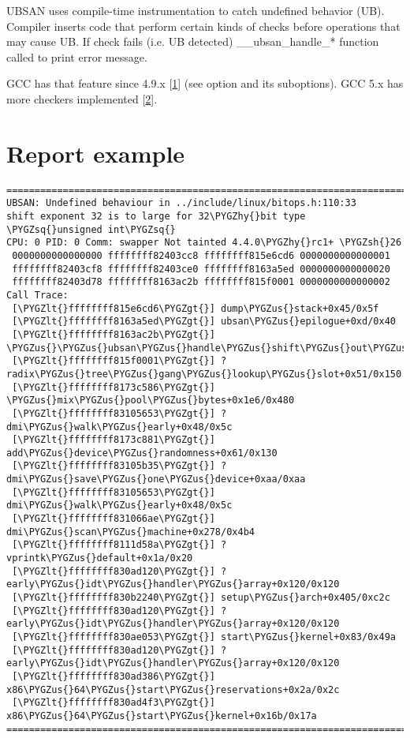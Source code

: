 \documentclass[a4paper,8pt,english]{sphinxmanual}
\def\PYGZus{\char`\_}
\def\PYGZlt{\char`\<}
\def\PYGZgt{\char`\>}
\def\PYGZsh{\char`\#}
\def\PYGZhy{\char`\-}
\def\PYGZsq{\char`\'}
\renewcommand\PYGZsq{\textquotesingle}
\begin{document}
UBSAN uses compile-time instrumentation to catch undefined behavior (UB).
Compiler inserts code that perform certain kinds of checks before operations
that may cause UB. If check fails (i.e. UB detected) \_\_ubsan\_handle\_*
function called to print error message.

GCC has that feature since 4.9.x {[}\href{https://gcc.gnu.org/onlinedocs/gcc-4.9.0/gcc/Debugging-Options.html}{1}{]} (see  option and
its suboptions). GCC 5.x has more checkers implemented {[}\href{https://gcc.gnu.org/onlinedocs/gcc/Debugging-Options.html}{2}{]}.


\section{Report example}
\label{dev-tools/ubsan:report-example}
\begin{Verbatim}[commandchars=\\\{\}]
================================================================================
UBSAN: Undefined behaviour in ../include/linux/bitops.h:110:33
shift exponent 32 is to large for 32\PYGZhy{}bit type \PYGZsq{}unsigned int\PYGZsq{}
CPU: 0 PID: 0 Comm: swapper Not tainted 4.4.0\PYGZhy{}rc1+ \PYGZsh{}26
 0000000000000000 ffffffff82403cc8 ffffffff815e6cd6 0000000000000001
 ffffffff82403cf8 ffffffff82403ce0 ffffffff8163a5ed 0000000000000020
 ffffffff82403d78 ffffffff8163ac2b ffffffff815f0001 0000000000000002
Call Trace:
 [\PYGZlt{}ffffffff815e6cd6\PYGZgt{}] dump\PYGZus{}stack+0x45/0x5f
 [\PYGZlt{}ffffffff8163a5ed\PYGZgt{}] ubsan\PYGZus{}epilogue+0xd/0x40
 [\PYGZlt{}ffffffff8163ac2b\PYGZgt{}] \PYGZus{}\PYGZus{}ubsan\PYGZus{}handle\PYGZus{}shift\PYGZus{}out\PYGZus{}of\PYGZus{}bounds+0xeb/0x130
 [\PYGZlt{}ffffffff815f0001\PYGZgt{}] ? radix\PYGZus{}tree\PYGZus{}gang\PYGZus{}lookup\PYGZus{}slot+0x51/0x150
 [\PYGZlt{}ffffffff8173c586\PYGZgt{}] \PYGZus{}mix\PYGZus{}pool\PYGZus{}bytes+0x1e6/0x480
 [\PYGZlt{}ffffffff83105653\PYGZgt{}] ? dmi\PYGZus{}walk\PYGZus{}early+0x48/0x5c
 [\PYGZlt{}ffffffff8173c881\PYGZgt{}] add\PYGZus{}device\PYGZus{}randomness+0x61/0x130
 [\PYGZlt{}ffffffff83105b35\PYGZgt{}] ? dmi\PYGZus{}save\PYGZus{}one\PYGZus{}device+0xaa/0xaa
 [\PYGZlt{}ffffffff83105653\PYGZgt{}] dmi\PYGZus{}walk\PYGZus{}early+0x48/0x5c
 [\PYGZlt{}ffffffff831066ae\PYGZgt{}] dmi\PYGZus{}scan\PYGZus{}machine+0x278/0x4b4
 [\PYGZlt{}ffffffff8111d58a\PYGZgt{}] ? vprintk\PYGZus{}default+0x1a/0x20
 [\PYGZlt{}ffffffff830ad120\PYGZgt{}] ? early\PYGZus{}idt\PYGZus{}handler\PYGZus{}array+0x120/0x120
 [\PYGZlt{}ffffffff830b2240\PYGZgt{}] setup\PYGZus{}arch+0x405/0xc2c
 [\PYGZlt{}ffffffff830ad120\PYGZgt{}] ? early\PYGZus{}idt\PYGZus{}handler\PYGZus{}array+0x120/0x120
 [\PYGZlt{}ffffffff830ae053\PYGZgt{}] start\PYGZus{}kernel+0x83/0x49a
 [\PYGZlt{}ffffffff830ad120\PYGZgt{}] ? early\PYGZus{}idt\PYGZus{}handler\PYGZus{}array+0x120/0x120
 [\PYGZlt{}ffffffff830ad386\PYGZgt{}] x86\PYGZus{}64\PYGZus{}start\PYGZus{}reservations+0x2a/0x2c
 [\PYGZlt{}ffffffff830ad4f3\PYGZgt{}] x86\PYGZus{}64\PYGZus{}start\PYGZus{}kernel+0x16b/0x17a
================================================================================
\end{Verbatim}
\end{document}
